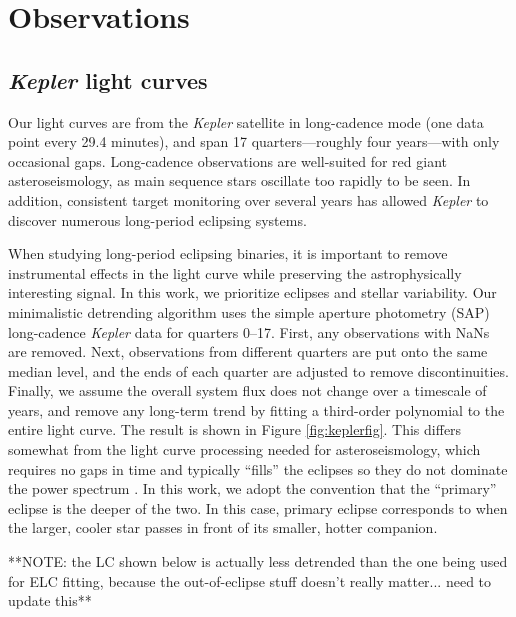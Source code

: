 \section{Observations}\label{data}

\subsection{\emph{Kepler} light curves}\label{kepler}
Our light curves are from the \emph{Kepler} satellite in long-cadence mode (one data point every 29.4 minutes), and span 17 quarters---roughly four years---with only occasional gaps. Long-cadence observations are well-suited for red giant asteroseismology, as main sequence stars oscillate too rapidly to be seen. In addition, consistent target monitoring over several years has allowed \emph{Kepler} to discover numerous long-period eclipsing systems.

When studying long-period eclipsing binaries, it is important to remove instrumental effects in the light curve while preserving the astrophysically interesting signal. In this work, we prioritize eclipses and stellar variability. Our minimalistic detrending algorithm uses the simple aperture photometry (SAP) long-cadence \emph{Kepler} data for quarters 0--17. First, any observations with NaNs are removed. Next, observations from different quarters are put onto the same median level, and the ends of each quarter are adjusted to remove discontinuities. Finally, we assume the overall system flux does not change over a timescale of years, and remove any long-term trend by fitting a third-order polynomial to the entire light curve. The result is shown in Figure \ref{fig:keplerfig}. This differs somewhat from the light curve processing needed for asteroseismology, which requires no gaps in time and typically ``fills'' the eclipses so they do not dominate the power spectrum \citep{gau14}. In this work, we adopt the convention that the ``primary'' eclipse is the deeper of the two. In this case, primary eclipse corresponds to when the larger, cooler star passes in front of its smaller, hotter companion.

**NOTE: the LC shown below is actually less detrended than the one being used for ELC fitting, because the out-of-eclipse stuff doesn't really matter... need to update this**
